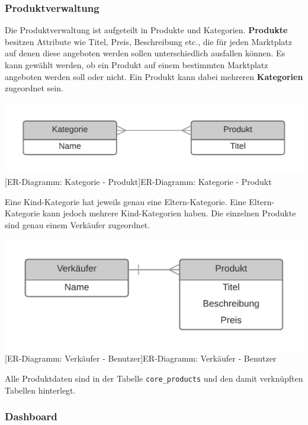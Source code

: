 	\subsubsection{Produktverwaltung}
	
	Die Produktverwaltung ist aufgeteilt in Produkte und Kategorien. \textbf{Produkte} besitzen Attribute wie Titel, Preis, Beschreibung etc., die für jeden Marktplatz auf denen diese angeboten werden sollen unterschiedlich ausfallen können. Es kann gewählt werden, ob ein Produkt auf einem bestimmten Marktplatz angeboten werden soll oder nicht. Ein Produkt kann dabei mehreren \textbf{Kategorien} zugeordnet sein.\\
	\begin{minipage}{\linewidth}
		\vspace{1em}
		\centering
		\includegraphics[width=0.6\linewidth]{img/ERD_Category_Product}
		[ER-Diagramm: Kategorie - Produkt]{ER-Diagramm: Kategorie - Produkt}
		\label{fig:header}
		\vspace{1em}
	\end{minipage}
	Eine Kind-Kategorie hat jeweils genau eine Eltern-Kategorie. Eine Eltern-Kategorie kann jedoch mehrere Kind-Kategorien haben. Die einzelnen Produkte sind genau einem Verkäufer zugeordnet. \\
	\begin{minipage}{\linewidth}
		\vspace{1em}
		\centering
		\includegraphics[width=0.6\linewidth]{img/ERD_Seller_Product}
		[ER-Diagramm: Verkäufer - Benutzer]{ER-Diagramm: Verkäufer - Benutzer}
		\label{fig:header}
		\vspace{1em}
	\end{minipage}
	
	Alle Produktdaten sind in der Tabelle \texttt{core\_products} und den damit verknüpften Tabellen hinterlegt.
	
	\subsubsection{Dashboard}
	
